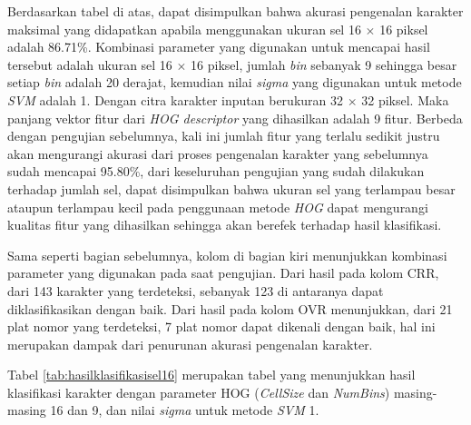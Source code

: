 \noindent Berdasarkan tabel di atas, dapat disimpulkan bahwa akurasi pengenalan karakter maksimal yang didapatkan apabila menggunakan ukuran sel 16 $\times$ 16 piksel adalah 86.71\%. Kombinasi parameter yang digunakan untuk mencapai hasil tersebut adalah ukuran sel 16 $\times$ 16 piksel, jumlah \textit{bin} sebanyak 9 sehingga besar setiap \textit{bin} adalah 20 derajat, kemudian nilai \textit{sigma} yang digunakan untuk metode \textit{SVM} adalah 1. Dengan citra karakter inputan berukuran 32 $\times$ 32 piksel. Maka panjang vektor fitur dari \textit{HOG descriptor} yang dihasilkan adalah 9 fitur. Berbeda dengan pengujian sebelumnya, kali ini jumlah fitur yang terlalu sedikit justru akan mengurangi akurasi dari proses pengenalan karakter yang sebelumnya sudah mencapai 95.80\%, dari keseluruhan pengujian yang sudah dilakukan terhadap jumlah sel, dapat disimpulkan bahwa ukuran sel yang terlampau besar ataupun terlampau kecil pada penggunaan metode \textit{HOG} dapat mengurangi kualitas fitur yang dihasilkan sehingga akan berefek terhadap hasil klasifikasi.

\noindent Sama seperti bagian sebelumnya, kolom di bagian kiri menunjukkan kombinasi parameter yang digunakan pada saat pengujian. Dari hasil pada kolom CRR, dari 143 karakter yang terdeteksi, sebanyak 123 di antaranya dapat diklasifikasikan dengan baik. Dari hasil pada kolom OVR menunjukkan, dari 21 plat nomor yang terdeteksi, 7 plat nomor dapat dikenali dengan baik, hal ini merupakan dampak dari penurunan akurasi pengenalan karakter.

\noindent Tabel \ref{tab:hasilklasifikasisel16} merupakan tabel yang menunjukkan hasil klasifikasi karakter dengan parameter HOG (\textit{CellSize} dan \textit{NumBins}) masing-masing 16 dan 9, dan nilai \textit{sigma} untuk metode \textit{SVM} 1.

